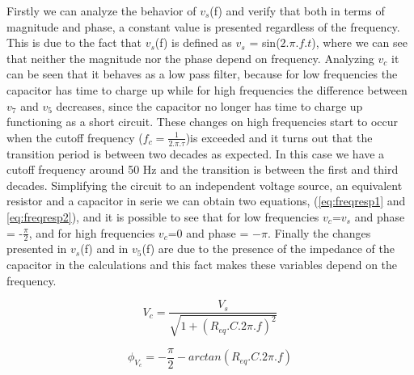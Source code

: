 Firstly we can analyze the behavior of $v_s$(f) and verify that both in terms of magnitude and phase, a constant value is presented regardless of the frequency. This is due to the fact that $v_s$(f) is defined as $v_s$ = sin($2$.$\pi$.$f$.$t$), where we can see that neither the magnitude nor the phase depend on frequency.
Analyzing $v_c$ it can be seen that it behaves as a low pass filter, because for low frequencies the capacitor has time to charge up while for high frequencies the difference between $v_7$ and $v_5$ decreases, since the capacitor no longer has time to charge up functioning as a short circuit. These changes on high frequencies start to occur when the cutoff frequency ($f_c = \frac{1}{2.\pi.\tau}$)is exceeded and it turns out that the transition period is between two decades as expected. In this case we have a cutoff frequency around 50 Hz and the transition is between the first and third decades. 
Simplifying the circuit to an independent voltage source, an equivalent resistor and a capacitor in serie we can obtain two equations, (\ref{eq:freqresp1} and \ref{eq:freqresp2}), and it is possible to see that for low frequencies $v_c$=$v_s$ and phase = -$\frac{\pi}{2}$, and for high frequencies $v_c$=$0$ and phase = $-\pi$.
Finally the changes presented in $v_s$(f) and in $v_5$(f) are due to the presence of the impedance of the capacitor in the calculations and this fact makes these variables depend on the frequency. 

\begin{equation}
  V_c = \frac{V_s}{\sqrt{1 + (R_{eq}.C.2\pi.f)^2}}
  \label{eq:freqresp1}
\end{equation}

\begin{equation}
  \phi_{V_c} = -\frac{\pi}{2} - arctan(R_{eq}.C.2\pi.f)
  \label{eq:freqresp2}
\end{equation}















